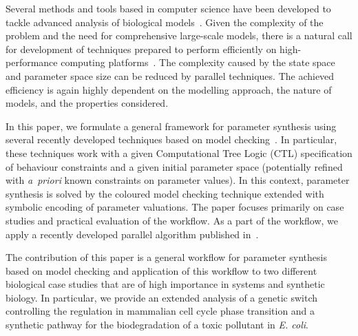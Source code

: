 \documentclass{llncs}
\begin{document}

Several methods and tools based in computer science have been developed to tackle advanced analysis of biological models~\cite{reviewEzio16}. Given the complexity of the problem and the need for comprehensive large-scale
models, there is a natural call for development of techniques prepared to
perform efficiently on high-performance computing
platforms~\cite{BGMP09}. 
The complexity caused by the state space and parameter space size can be reduced by parallel techniques. The achieved efficiency is
again highly dependent on the modelling approach, the nature of models, and the
properties considered. %

In this paper, we formulate a general framework for parameter synthesis using several recently developed techniques based on model checking~\cite{CMSB15,TCBB,ATVA}.
In particular, these techniques work with a given Computational Tree Logic (CTL) specification of behaviour constraints and a given initial parameter space (potentially refined with \emph{a~priori} known constraints on parameter values). In this context, parameter synthesis is solved by the coloured model checking technique extended with symbolic encoding of parameter valuations. The paper focuses primarily on case studies and practical evaluation of the workflow. As a part of the workflow, we apply a recently developed parallel algorithm published in~\cite{ATVA}.

The contribution of this paper is a general workflow for parameter synthesis based on model checking and application of this workflow to two different biological case studies that are of high importance in systems and synthetic biology. In particular,  we provide an extended analysis of a genetic switch controlling the regulation in mammalian cell cycle phase transition and a synthetic pathway for the biodegradation of a toxic pollutant in \emph{E. coli}.

\enlargethispage*{5mm}
\end{document}
